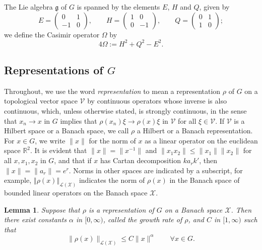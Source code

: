 \documentclass[12pt,a4paper]{amsart}
\newtheorem{lem}[thm]{Lemma}
\theoremstyle{definition}
\theoremstyle{remark}
\numberwithin{equation}{section}
\newcommand{\norm}[1]{\left\Vert#1\right\Vert}
\newcommand{\R}{\mathbb{R}}
\newcommand{\Ban}{\mathcal{X}}
\newcommand{\frk}[1]{\mathfrak{#1}}
\newcommand{\rep}{\rho}
\def\be{\begin{equation}}
\def\ee{\end{equation}}
\begin{document}
The  Lie algebra $\frk{g}$ of $G$ is spanned  by the elements $E$, $H$ and $Q$, given by
\begin{equation*} %
E   = \begin{pmatrix}
        0 & 1 \\
        -1 & 0
      \end{pmatrix},
\qquad      
H = \begin{pmatrix}
        1 & 0 \\
        0 & -1 
      \end{pmatrix},
\qquad
Q = \begin{pmatrix}
        0 & 1 \\
        1 & 0 
      \end{pmatrix}   ;
\end{equation*}
we define the Casimir operator $\Omega$ by
\[
4\Omega :=H^2+Q^2-E^2.
\]


\subsection*{Representations of $G$}
Throughout, we use the word \emph{representation} to mean a representation $\rho$ of $G$ on a topological vector space $\mathcal{V}$ by continuous operators whose inverse is also continuous, which, unless otherwise stated,
 is strongly continuous, in the sense that $x_n \to x$ in $G$ implies that $\rep(x_n) \xi \to \rep(x)\xi$ in $\mathcal{V}$ for all $\xi \in \mathcal{V}$.
If $\mathcal{V}$ is a Hilbert space or a Banach space, we call $\rho$ a Hilbert or a Banach representation.
For $x \in G$, we write $\|x\|$ for the norm of $x$ as a linear operator on the euclidean space $\R^2$.
It is evident that $\|x\| = \|x^{-1}\|$ and $\| x_1 x_2\| \leq \| x_1 \| \| x_2\|$ for all $x, x_1, x_2$ in $G$, and that if $x$ has Cartan decomposition $k a_r k'$, then $\|x\| = \|a_r\|= e^r$.
Norms in other spaces are indicated by a subscript, for example, $\norm{\rho(x)}_{\mathcal{L}(\Ban)}$ indicates the norm of $\rho(x)$ in the Banach space of bounded linear operators on the Banach space $\Ban$.

\begin{lem}\label{lem:mod-growth}
Suppose that $\rho$ is a representation of $G$ on a Banach space $\Ban$.
Then there exist constants $\alpha$ in $[0,\infty)$, called the growth rate of $\rep$, and $C$ in $[1,\infty)$ such that
\be\label{eq:mod-growth}
\| \rep(x) \|_{\mathcal{L}(\mathcal{X})} \leq C \|x\|^\alpha
\qquad\forall x \in G.
\ee
\end{lem}
\end{document}
